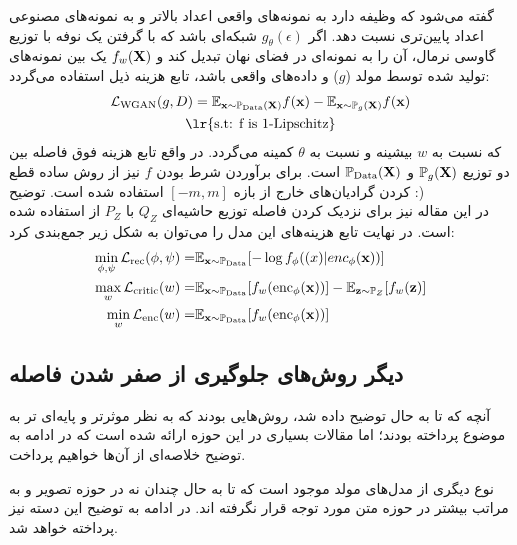 گفته می‌شود که وظیفه دارد به نمونه‌های واقعی اعداد بالاتر و به نمونه‌های مصنوعی اعداد پایین‌تری نسبت دهد.
اگر $g_\theta(\epsilon)$ شبکه‌ای باشد که با گرفتن یک نوفه با توزیع گاوسی نرمال، آن را به نمونه‌ای در فضای نهان تبدیل کند و $f_w({\bf X})$ یک \critic{} بین نمونه‌های تولید شده توسط مولد ($g$) و داده‌های واقعی باشد، تابع هزینه ذیل استفاده می‌گردد:
\begin{gather}
\mathcal{L}_\text{WGAN} (g, D)= 
\expected_{\bff{x} \sim \prob_\text{Data}(\bff{X})} f(\bff{x})
- \expected_{\bff{x} \sim \prob_g(\bff{X})} f(\bff{x})
\\
\text{\lr{s.t: f is 1-Lipschitz}} \nonumber
\end{gather}
که نسبت به $w$ بیشینه و نسبت به $\theta$ کمینه می‌گردد. در واقع تابع هزینه فوق فاصله \wasser{} بین دو توزیع $\mathbb P_g({\bf X})$ و $\mathbb P_\text{Data}({\bf X})$ است. برای برآوردن شرط  بودن $f$ نیز از روش ساده قطع کردن گرادیان‌های خارج از بازه $[-m, m]$ استفاده شده است.
توضیح  :)
\\
در این مقاله نیز برای نزدیک کردن فاصله توزیع حاشیه‌ای $Q_Z$ با $P_Z$ از \wgan{} استفاده شده است. در نهایت تابع هزینه‌های این مدل را می‌توان به شکل زیر جمع‌بندی کرد:
    \begin{align}
        \min_{\phi, \psi} {\mathcal{L}}_\text{rec}(\phi, \psi) =& \mathbb E_{{\bf x} \sim \mathbb P_\text{Data}} [- \log f_\phi({\bf (}x)|enc_\phi({\bf x}))] \nonumber
        \\
        \max_{w} {\mathcal{L}}_\text{critic}(w) =& 
        \mathbb E_{{\bf x} \sim \mathbb P_\text{Data}} [f_w(\text{enc}_\phi({\bf x}))]
        -\mathbb E_{{\bf z} \sim \mathbb P_Z} [f_w({\bf z})] \nonumber
        \\
        \min_{w} {\mathcal{L}}_\text{enc}(w) =& 
        \mathbb E_{{\bf x} \sim \mathbb P_\text{Data}} [f_w(\text{enc}_\phi({\bf x}))]
    \end{align}
\subsection{دیگر روش‌های جلوگیری از صفر شدن فاصله }
آنچه که تا به حال توضیح داده شد، روش‌هایی بودند که به نظر موثرتر و پایه‌ای تر به موضوع پرداخته بودند؛ اما مقالات بسیاری در این حوزه ارائه شده است که در ادامه به توضیح خلاصه‌ای از آن‌ها خواهیم پرداخت.

نوع دیگری از مدل‌های مولد موجود است که تا به حال چندان نه در حوزه تصویر و به مراتب بیشتر در حوزه متن مورد توجه قرار نگرفته اند. در ادامه به توضیح این دسته نیز پرداخته خواهد شد.
